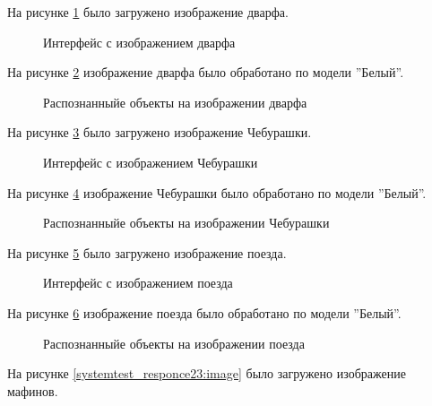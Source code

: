 На рисунке \ref{systemtest_responce17:image} было загружено изображение дварфа.

\begin{figure}[H]
\caption{Интерфейс с изображением дварфа}
\label{systemtest_responce17:image}
\end{figure}

На рисунке \ref{systemtest_responce18:image} изображение дварфа было обработано по модели ''Белый''.

\begin{figure}[H]
\caption{Распознанныйе объекты на изображении дварфа}
\label{systemtest_responce18:image}
\end{figure}
На рисунке \ref{systemtest_responce19:image} было загружено изображение Чебурашки.

\begin{figure}[H]
\caption{Интерфейс с изображением Чебурашки}
\label{systemtest_responce19:image}
\end{figure}

На рисунке \ref{systemtest_responce20:image} изображение Чебурашки было обработано по модели ''Белый''.

\begin{figure}[H]
\caption{Распознанныйе объекты на изображении Чебурашки}
\label{systemtest_responce20:image}
\end{figure}

На рисунке \ref{systemtest_responce21:image} было загружено изображение поезда.

\begin{figure}[H]
\caption{Интерфейс с изображением поезда}
\label{systemtest_responce21:image}
\end{figure}

На рисунке \ref{systemtest_responce22:image} изображение поезда было обработано по модели ''Белый''.

\begin{figure}[H]
\caption{Распознанныйе объекты на изображении поезда}
\label{systemtest_responce22:image}
\end{figure}

На рисунке \ref{systemtest_responce23:image} было загружено изображение мафинов.

